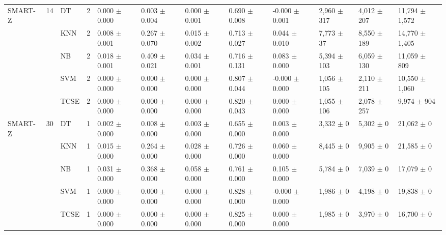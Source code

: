 \begin{table}[t]
\begin{tabular}{llllllllllll}
SMART-Z & 14 & DT & 2 & 0.000 $\pm$ 0.000 & 0.003 $\pm$ 0.004 & 0.000 $\pm$ 0.001 & 0.690 $\pm$ 0.008 & -0.000 $\pm$ 0.001 & 2,960 $\pm$ 317 & 4,012 $\pm$ 207 & 11,794 $\pm$ 1,572 \\
 &  & KNN & 2 & 0.008 $\pm$ 0.001 & 0.267 $\pm$ 0.070 & 0.015 $\pm$ 0.002 & 0.713 $\pm$ 0.027 & 0.044 $\pm$ 0.010 & 7,773 $\pm$ 37 & 8,550 $\pm$ 189 & 14,770 $\pm$ 1,405 \\
 &  & NB & 2 & 0.018 $\pm$ 0.001 & 0.409 $\pm$ 0.021 & 0.034 $\pm$ 0.001 & 0.716 $\pm$ 0.131 & 0.083 $\pm$ 0.000 & 5,394 $\pm$ 103 & 6,059 $\pm$ 130 & 11,059 $\pm$ 809 \\
 &  & SVM & 2 & 0.000 $\pm$ 0.000 & 0.000 $\pm$ 0.000 & 0.000 $\pm$ 0.000 & 0.807 $\pm$ 0.044 & -0.000 $\pm$ 0.000 & 1,056 $\pm$ 105 & 2,110 $\pm$ 211 & 10,550 $\pm$ 1,060 \\
 &  & TCSE & 2 & 0.000 $\pm$ 0.000 & 0.000 $\pm$ 0.000 & 0.000 $\pm$ 0.000 & 0.820 $\pm$ 0.043 & 0.000 $\pm$ 0.000 & 1,055 $\pm$ 106 & 2,078 $\pm$ 257 & 9,974 $\pm$ 904 \\
SMART-Z & 30 & DT & 1 & 0.002 $\pm$ 0.000 & 0.008 $\pm$ 0.000 & 0.003 $\pm$ 0.000 & 0.655 $\pm$ 0.000 & 0.003 $\pm$ 0.000 & 3,332 $\pm$ 0 & 5,302 $\pm$ 0 & 21,062 $\pm$ 0 \\
 &  & KNN & 1 & 0.015 $\pm$ 0.000 & 0.264 $\pm$ 0.000 & 0.028 $\pm$ 0.000 & 0.726 $\pm$ 0.000 & 0.060 $\pm$ 0.000 & 8,445 $\pm$ 0 & 9,905 $\pm$ 0 & 21,585 $\pm$ 0 \\
 &  & NB & 1 & 0.031 $\pm$ 0.000 & 0.368 $\pm$ 0.000 & 0.058 $\pm$ 0.000 & 0.761 $\pm$ 0.000 & 0.105 $\pm$ 0.000 & 5,784 $\pm$ 0 & 7,039 $\pm$ 0 & 17,079 $\pm$ 0 \\
 &  & SVM & 1 & 0.000 $\pm$ 0.000 & 0.000 $\pm$ 0.000 & 0.000 $\pm$ 0.000 & 0.828 $\pm$ 0.000 & -0.000 $\pm$ 0.000 & 1,986 $\pm$ 0 & 4,198 $\pm$ 0 & 19,838 $\pm$ 0 \\
 &  & TCSE & 1 & 0.000 $\pm$ 0.000 & 0.000 $\pm$ 0.000 & 0.000 $\pm$ 0.000 & 0.825 $\pm$ 0.000 & 0.000 $\pm$ 0.000 & 1,985 $\pm$ 0 & 3,970 $\pm$ 0 & 16,700 $\pm$ 0 \\
\bottomrule
\end{tabular}
\end{table}
